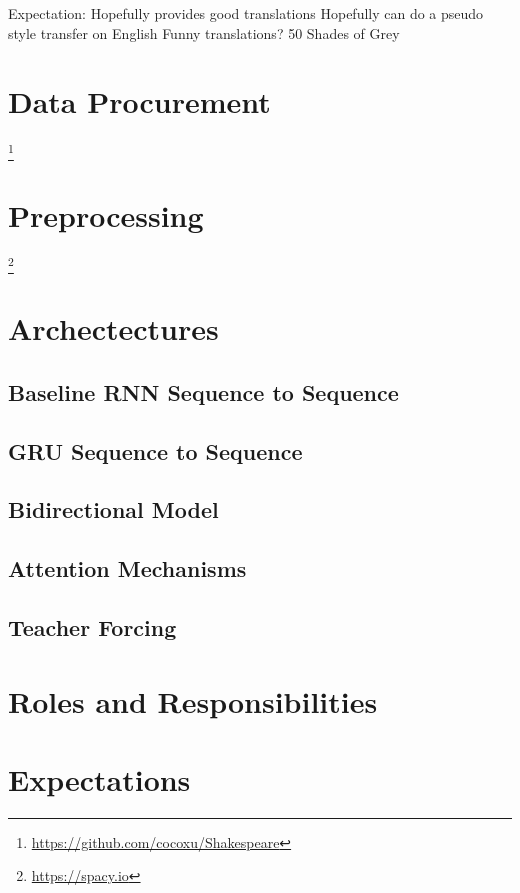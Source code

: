 \documentclass[twoside,twocolumn]{article}
\begin{document}
Expectation:
	Hopefully provides good translations
	Hopefully can do a pseudo style transfer on English
	Funny translations? 50 Shades of Grey
\section{Data Procurement}
\footnote{\url{https://github.com/cocoxu/Shakespeare}}
\section{Preprocessing}
\footnote{\url{https://spacy.io}}
\section{Archectectures}

\subsection{Baseline RNN Sequence to Sequence}

\subsection{GRU Sequence to Sequence}

\subsection{Bidirectional Model}

\subsection{Attention Mechanisms}

\subsection{Teacher Forcing}

\section{Roles and Responsibilities}

\section{Expectations}



\end{document}
